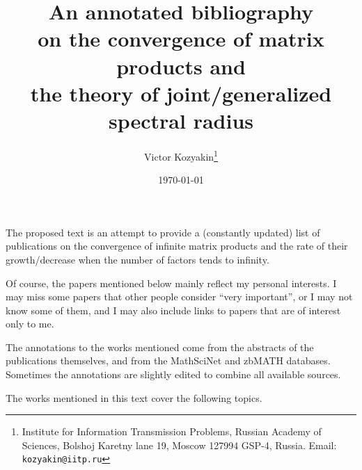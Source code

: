 \documentclass[a4paper,fleqn]{article}
\begin{document}
\title{\bf An annotated bibliography\\ on the convergence of matrix products and\\ the theory of joint/generalized spectral radius}

\author{Victor Kozyakin\thanks{Institute for Information Transmission Problems, Russian Academy of Sciences, Bolshoj Karetny lane 19, Moscow 127994 GSP-4, Russia. Email: \texttt{kozyakin@iitp.ru}}}

\date{\today}

\maketitle

%
The proposed text is an attempt to provide a (constantly updated) list of publications on the convergence of infinite matrix products and the rate of their growth/decrease when the number of factors tends to infinity.

Of course, the papers mentioned below mainly reflect my personal interests. I may miss some papers that other people consider ``very important'', or I may not know some of them, and I may also include links to papers that are of interest only to me.

The annotations to the works mentioned come from the abstracts of the publications themselves, and from the MathSciNet and zbMATH databases. Sometimes the annotations are slightly edited to combine all available sources.

The works mentioned in this text cover the following topics.
\end{document}
